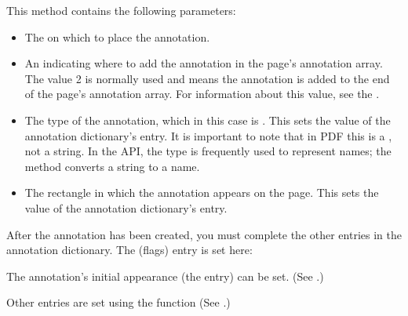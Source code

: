 \documentclass[letterpaper,12pt,english,openany,oneside]{sphinxmanual}
\begin{document}
This method contains the following parameters:
\begin{itemize}
\item {} 
The  on which to place the annotation.

\item {} 
An  indicating where to add the annotation in the page’s annotation array. The value \sphinxhyphen{}2 is normally used and means the annotation is added to the end of the page’s annotation array. For information about this value, see the .

\item {} 
The type of the annotation, which in this case is . This sets the value of the annotation dictionary’s  entry. It is important to note that in PDF this is a , not a string. In the API, the  type is frequently used to represent names; the  method converts a string to a name.

\item {} 
The rectangle in which the annotation appears on the page. This sets the value of the annotation dictionary’s  entry.

\end{itemize}

After the annotation has been created, you must complete the other entries in the annotation dictionary. The  (flags) entry is set here:

\begin{sphinxVerbatim}[commandchars=\\\{\}]
   
\end{sphinxVerbatim}

The annotation’s initial appearance (the  entry) can be set. (See .)

Other entries are set using the  function (See .)
\end{document}
